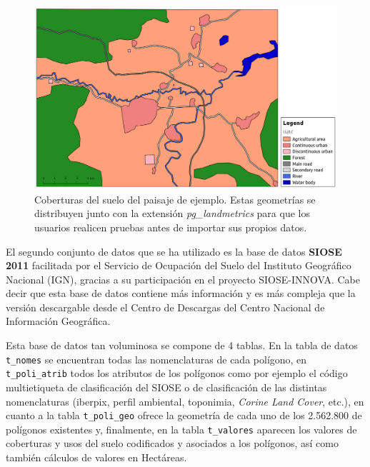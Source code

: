 \begin{figure}
\begin{center}
\includegraphics[width=\textwidth]{Metodologia/Figs/zona_andrea.png}
\caption{Coberturas del suelo del paisaje de ejemplo. Estas geometrías se distribuyen junto con la extensión \textit{pg\_landmetrics} para que los usuarios realicen pruebas antes de importar sus propios datos. \label{fig:zona_andrea}}
\end{center}
\end{figure}

El segundo conjunto de datos que se ha utilizado es la base de datos \textbf{SIOSE 2011} facilitada por el Servicio de Ocupación del Suelo del Instituto Geográfico Nacional (IGN), gracias a su participación en el proyecto SIOSE-INNOVA. Cabe decir que esta base de datos contiene más información y es más compleja que la versión descargable desde el Centro de Descargas del Centro Nacional de Información Geográfica.

Esta base de datos tan voluminosa se compone de 4 tablas. En la tabla de datos \texttt{t\_nomes} se encuentran todas las nomenclaturas de cada polígono, en \texttt{t\_poli\_atrib} todos los atributos de los polígonos como por ejemplo el código multietiqueta de clasificación del SIOSE o de clasificación de las distintas nomenclaturas (iberpix, perfil ambiental, toponimia, \textit{Corine Land Cover}, etc.), en cuanto a la tabla \texttt{t\_poli\_geo} ofrece la geometría de cada uno de los 2.562.800 de polígonos existentes y, finalmente, en la tabla \texttt{t\_valores} aparecen los valores de coberturas y usos del suelo codificados y asociados a los polígonos, así como también cálculos de valores en Hectáreas.

